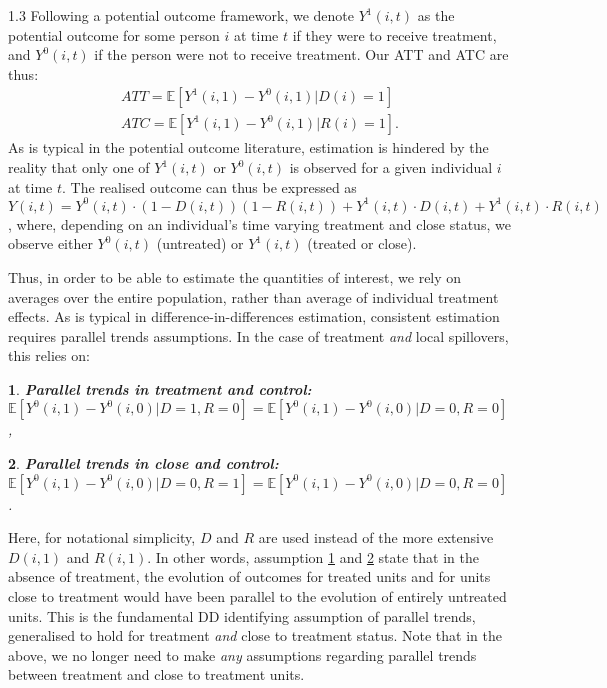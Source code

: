\documentclass{article}
\makeatletter
\newtheorem*{assumption*}{\assumptionnumber}
\providecommand{\assumptionnumber}{}
\newenvironment{assumption}[2]
 {%
  \renewcommand{\assumptionnumber}{Assumption #1{#2}}%
  \begin{assumption*}%
  \protected@edef\@currentlabel{#1}%
 }
 {%
  \end{assumption*}
 }
\makeatother
\begin{document}
\begin{spacing}{1.3}
Following a potential outcome framework, we denote $Y^1(i,t)$ as the potential
outcome for some person $i$ at time $t$ if they were to receive treatment, and
$Y^0(i,t)$ if the person were not to receive treatment.  Our ATT and ATC are
thus:
\begin{eqnarray}
\label{Seqn:estim}
ATT=\mathbb{E}[Y^1(i,1)-Y^0(i,1)|D(i)=1]\  \\
ATC=\mathbb{E}[Y^1(i,1)-Y^0(i,1)|R(i)=1].
\end{eqnarray}
As is typical in the potential outcome literature, estimation is hindered by the
reality that only one of $Y^1(i,t)$ or $Y^0(i,t)$ is observed for a given 
individual $i$ at time $t$.  The realised outcome can thus be expressed as 
$Y(i,t)=Y^0(i,t)\cdot (1-D(i,t))(1-R(i,t))+Y^1(i,t)\cdot D(i,t)+Y^1(i,t)\cdot 
R(i,t)$, where, depending on an individual's time varying treatment and close
status, we observe either $Y^0(i,t)$ (untreated) or $Y^1(i,t)$ (treated or 
close).

Thus, in order to be able to estimate the quantities of interest, we rely on
averages over the entire population, rather than average of individual 
treatment effects.  As is typical in difference-in-differences estimation,
consistent estimation requires parallel trends assumptions.  In the case of
treatment \emph{and} local spillovers, this relies on:

\begin{assumption}{1}{}
\label{Sass:PT}
\textbf{Parallel trends in treatment and control:} \\
$\mathbb{E}[Y^0(i,1)-Y^0(i,0)|D=1,R=0]=\mathbb{E}[Y^0(i,1)-Y^0(i,0)|D=0,R=0]$,
\end{assumption}
\begin{assumption}{2}{}
\label{Sass:PTC}
\textbf{Parallel trends in close and control:} \\
$\mathbb{E}[Y^0(i,1)-Y^0(i,0)|D=0,R=1]=\mathbb{E}[Y^0(i,1)-Y^0(i,0)|D=0,R=0]$.
\end{assumption}

Here, for notational simplicity, $D$ and $R$ are used instead of the more 
extensive $D(i,1)$ and $R(i,1)$.  In other words, assumption \ref{Sass:PT}
and \ref{Sass:PTC} state that in the absence of treatment, the evolution
of outcomes for treated units and for units close to treatment would have
been parallel to the evolution of entirely untreated units.  This is the
fundamental DD identifying assumption of parallel trends, generalised to
hold for treatment \emph{and} close to treatment status.  Note that in
the above, we no longer need to make \emph{any} assumptions regarding
parallel trends between treatment and close to treatment units.


\end{spacing}
\end{document}
